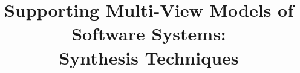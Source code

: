 \documentclass[dvips,a4paper,12pt]{report}
\begin{document}

\title{
  Supporting Multi-View Models of Software Systems: \\
  Synthesis Techniques
}




\tableofcontents
\listoffigures
\listoftables











\end{document}
